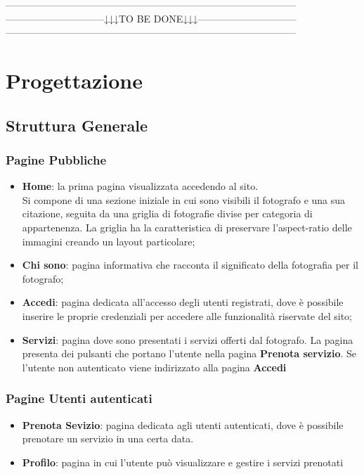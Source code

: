 -----------------------------------------------------------------------------------------\\
------------------------------↓↓↓TO BE DONE↓↓↓------------------------------\\
-----------------------------------------------------------------------------------------
\section{Progettazione}
\subsection{Struttura Generale}
\subsubsection{Pagine Pubbliche}
\begin{itemize}
    \item \textbf{Home}: la prima pagina visualizzata accedendo al sito.\\
    Si compone di una sezione iniziale in cui sono visibili il fotografo e una sua citazione, seguita da una 
    griglia di fotografie divise per categoria di appartenenza. La griglia ha la caratteristica di 
    preservare l'aspect-ratio delle immagini creando un layout particolare;
    \item \textbf{Chi sono}: pagina informativa che racconta il significato della fotografia per il fotografo;
    \item \textbf{Accedi}: pagina dedicata all'accesso degli utenti registrati, dove è possibile inserire le proprie 
    credenziali per accedere alle funzionalità riservate del sito;
    \item \textbf{Servizi}: pagina dove sono presentati i servizi offerti dal fotografo. La pagina presenta dei
    pulsanti che portano l'utente nella pagina \textbf{Prenota servizio}. Se l'utente non autenticato viene indirizzato alla
    pagina \textbf{Accedi}
\end{itemize}

\subsubsection{Pagine Utenti autenticati}
\begin{itemize}
\item \textbf{Prenota Sevizio}: pagina dedicata agli utenti autenticati, dove \`e possibile prenotare un servizio in una certa data.
\item \textbf{Profilo}: pagina in cui l'utente può visualizzare e gestire i servizi prenotati
\end{itemize}

